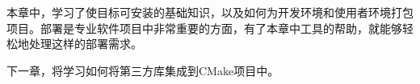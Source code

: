 本章中，学习了使目标可安装的基础知识，以及如何为开发环境和使用者环境打包项目。部署是专业软件项目中非常重要的方面，有了本章中工具的帮助，就能够轻松地处理这样的部署需求。

下一章，将学习如何将第三方库集成到CMake项目中。